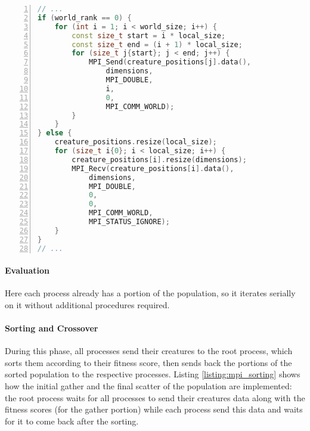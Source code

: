 \documentclass[12pt,a4paper,oneside]{article}
\begin{document}
	\begin{lstlisting}[language=C++,
		directivestyle={\color{black}},
		backgroundcolor=\color{lgrey},
    	basicstyle=\footnotesize \ttfamily \color{black} \bfseries,
		numbers=left,
		numbersep=5pt,
    	numberstyle=\tiny\color{black},
		commentstyle=\color{dkgreen},
    	rulecolor=\color{black},
    	keywordstyle=\color{purple},
    	morekeywords={size_t,std,MPI_Send,MPI_Recv},
		tabsize=2,
    	captionpos=b,
    	caption={Initialization of population with MPI.},
    	label={listing:mpi_init}
	   ]
// ...
if (world_rank == 0) {
	for (int i = 1; i < world_size; i++) {
		const size_t start = i * local_size;
		const size_t end = (i + 1) * local_size;
		for (size_t j{start}; j < end; j++) {
			MPI_Send(creature_positions[j].data(),
				dimensions,
				MPI_DOUBLE,
				i,
				0,
				MPI_COMM_WORLD);
		}
	}
} else {
	creature_positions.resize(local_size);
	for (size_t i{0}; i < local_size; i++) {
		creature_positions[i].resize(dimensions);
		MPI_Recv(creature_positions[i].data(),
			dimensions,
			MPI_DOUBLE,
			0,
			0,
			MPI_COMM_WORLD,
			MPI_STATUS_IGNORE);
	}
}
// ...
	\end{lstlisting}

	\paragraph{Evaluation}
	Here each process already has a portion of the population, so it iterates serially on it without additional procedures required.

	\paragraph{Sorting and Crossover}
	During this phase, all processes send their creatures to the root process, which sorts them according to their fitness score, then sends back the portions of the sorted population to the respective processes.
	Listing \ref{listing:mpi_sorting} shows how the initial gather and the final scatter of the population are implemented: the root process waits for all processes to send their creatures data along with the fitness scores (for the gather portion) while each process send this data and waits for it to come back after the sorting.
\end{document}
